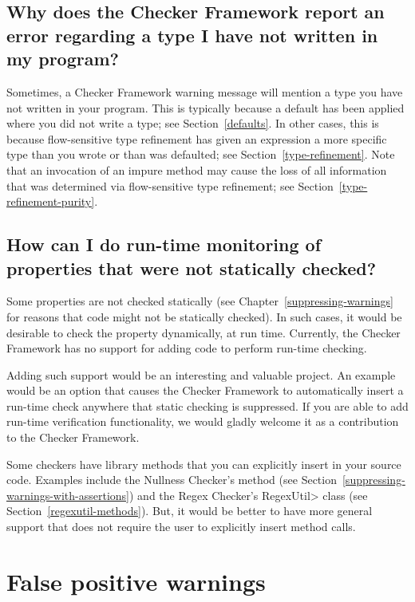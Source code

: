 \subsection{Why does the Checker Framework report an error regarding a type I have not written in my program?\label{faq-type-i-did-not-write}}

Sometimes, a Checker Framework warning message will mention a type you have
not written in your program.  This is typically because a default has been
applied where you did not write a type; see Section~\ref{defaults}.  In
other cases, this is because flow-sensitive type refinement has given an
expression a more specific type than you wrote or than was defaulted; see
Section~\ref{type-refinement}.
Note that an invocation of an impure method may cause the loss of all
information that was determined via flow-sensitive type refinement; see
Section~\ref{type-refinement-purity}.


\subsection{How can I do run-time monitoring of properties that were not statically checked?\label{faq-run-time-checking}}

Some properties are not checked statically (see
Chapter~\ref{suppressing-warnings} for reasons that code might not be
statically checked).  In such cases, it would be desirable to check the
property dynamically, at run time.
Currently, the Checker Framework has no support for adding code to perform
run-time checking.

Adding such support would be an interesting and valuable project.
An example would be an option that causes the Checker Framework to
automatically insert a run-time check anywhere that static checking is
suppressed.
If you
are able to add run-time verification functionality, we would gladly
welcome it as a contribution to the Checker Framework.

Some checkers have library methods that you can explicitly insert in your
source code.
Examples include the Nullness Checker's
 method (see
Section~\ref{suppressing-warnings-with-assertions}) and the Regex Checker's
\<RegexUtil> class (see Section~\ref{regexutil-methods}).
But, it would be better to have more general support that does not require
the user to explicitly insert method calls.


\section{False positive warnings\label{faq-false-positives-section}}


